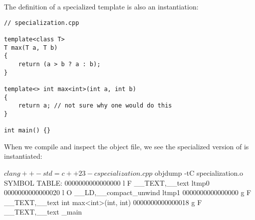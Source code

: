 \documentclass[12pt]{article}
\begin{document}
\noindent
The definition of a specialized template is also an instantiation:

\begin{lstlisting}[style=cxx]
// specialization.cpp

template<class T>
T max(T a, T b)
{
    return (a > b ? a : b);
}

template<> int max<int>(int a, int b)
{
    return a; // not sure why one would do this
}

int main() {}
\end{lstlisting}

\noindent
When we compile and inspect the object file, we see the specialized version of  is instantiated:

\begin{terminal}
$ clang++ -std=c++23 -c specialization.cpp
$ objdump -tC specialization.o
SYMBOL TABLE:
0000000000000000 l F __TEXT,__text ltmp0
0000000000000020 l O __LD,__compact_unwind ltmp1
0000000000000000 g F __TEXT,__text int max<int>(int, int)
0000000000000018 g F __TEXT,__text _main
\end{terminal}
\end{document}
